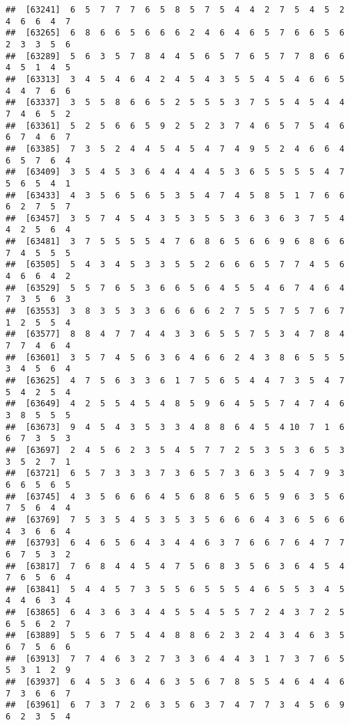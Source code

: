 \documentclass[
]{book}
\begin{document}
\begin{verbatim}
##  [63241]  6  5  7  7  7  6  5  8  5  7  5  4  4  2  7  5  4  5  2  4  6  6  4  7
##  [63265]  6  8  6  6  5  6  6  6  2  4  6  4  6  5  7  6  6  5  6  2  3  3  5  6
##  [63289]  5  6  3  5  7  8  4  4  5  6  5  7  6  5  7  7  8  6  6  4  5  1  4  5
##  [63313]  3  4  5  4  6  4  2  4  5  4  3  5  5  4  5  4  6  6  5  4  4  7  6  6
##  [63337]  3  5  5  8  6  6  5  2  5  5  5  3  7  5  5  4  5  4  4  7  4  6  5  2
##  [63361]  5  2  5  6  6  5  9  2  5  2  3  7  4  6  5  7  5  4  6  6  7  4  6  7
##  [63385]  7  3  5  2  4  4  5  4  5  4  7  4  9  5  2  4  6  6  4  6  5  7  6  4
##  [63409]  3  5  4  5  3  6  4  4  4  4  5  3  6  5  5  5  5  4  7  5  6  5  4  1
##  [63433]  4  3  5  6  5  6  5  3  5  4  7  4  5  8  5  1  7  6  6  6  2  7  5  7
##  [63457]  3  5  7  4  5  4  3  5  3  5  5  3  6  3  6  3  7  5  4  4  2  5  6  4
##  [63481]  3  7  5  5  5  5  4  7  6  8  6  5  6  6  9  6  8  6  6  7  4  5  5  5
##  [63505]  5  4  3  4  5  3  3  5  5  2  6  6  6  5  7  7  4  5  6  4  6  6  4  2
##  [63529]  5  5  7  6  5  3  6  6  5  6  4  5  5  4  6  7  4  6  4  7  3  5  6  3
##  [63553]  3  8  3  5  3  3  6  6  6  6  2  7  5  5  7  5  7  6  7  1  2  5  5  4
##  [63577]  8  8  4  7  7  4  4  3  3  6  5  5  7  5  3  4  7  8  4  7  7  4  6  4
##  [63601]  3  5  7  4  5  6  3  6  4  6  6  2  4  3  8  6  5  5  5  3  4  5  6  4
##  [63625]  4  7  5  6  3  3  6  1  7  5  6  5  4  4  7  3  5  4  7  5  4  2  5  4
##  [63649]  4  2  5  5  4  5  4  8  5  9  6  4  5  5  7  4  7  4  6  3  8  5  5  5
##  [63673]  9  4  5  4  3  5  3  3  4  8  8  6  4  5  4 10  7  1  6  6  7  3  5  3
##  [63697]  2  4  5  6  2  3  5  4  5  7  7  2  5  3  5  3  6  5  3  3  5  2  7  1
##  [63721]  6  5  7  3  3  3  7  3  6  5  7  3  6  3  5  4  7  9  3  6  6  5  6  5
##  [63745]  4  3  5  6  6  6  4  5  6  8  6  5  6  5  9  6  3  5  6  7  5  6  4  4
##  [63769]  7  5  3  5  4  5  3  5  3  5  6  6  6  4  3  6  5  6  6  4  3  6  6  4
##  [63793]  6  4  6  5  6  4  3  4  4  6  3  7  6  6  7  6  4  7  7  6  7  5  3  2
##  [63817]  7  6  8  4  4  5  4  7  5  6  8  3  5  6  3  6  4  5  4  7  6  5  6  4
##  [63841]  5  4  4  5  7  3  5  5  6  5  5  5  4  6  5  5  3  4  5  4  4  6  3  4
##  [63865]  6  4  3  6  3  4  4  5  5  4  5  5  7  2  4  3  7  2  5  6  5  6  2  7
##  [63889]  5  5  6  7  5  4  4  8  8  6  2  3  2  4  3  4  6  3  5  6  7  5  6  6
##  [63913]  7  7  4  6  3  2  7  3  3  6  4  4  3  1  7  3  7  6  5  5  3  1  2  9
##  [63937]  6  4  5  3  6  4  6  3  5  6  7  8  5  5  4  6  4  4  6  7  3  6  6  7
##  [63961]  6  7  3  7  2  6  3  5  6  3  7  4  7  7  3  4  5  6  9  6  2  3  5  4

\end{verbatim}
\end{document}
